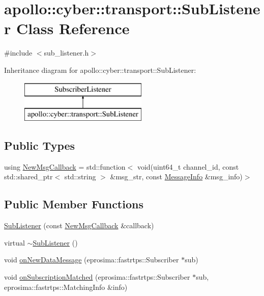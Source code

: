 \hypertarget{classapollo_1_1cyber_1_1transport_1_1SubListener}{\section{apollo\-:\-:cyber\-:\-:transport\-:\-:Sub\-Listener Class Reference}
\label{classapollo_1_1cyber_1_1transport_1_1SubListener}
}


{\ttfamily \#include $<$sub\-\_\-listener.\-h$>$}

Inheritance diagram for apollo\-:\-:cyber\-:\-:transport\-:\-:Sub\-Listener\-:\begin{figure}[H]
\begin{center}
\leavevmode
\includegraphics[height=2.000000cm]{classapollo_1_1cyber_1_1transport_1_1SubListener}
\end{center}
\end{figure}
\subsection*{Public Types}
\begin{DoxyCompactItemize}
\item 
using \hyperlink{classapollo_1_1cyber_1_1transport_1_1SubListener_a68a33307591d34661a88c1e637bb3d8f}{New\-Msg\-Callback} = std\-::function$<$ void(uint64\-\_\-t channel\-\_\-id, const std\-::shared\-\_\-ptr$<$ std\-::string $>$ \&msg\-\_\-str, const \hyperlink{classapollo_1_1cyber_1_1transport_1_1MessageInfo}{Message\-Info} \&msg\-\_\-info)$>$
\end{DoxyCompactItemize}
\subsection*{Public Member Functions}
\begin{DoxyCompactItemize}
\item 
\hyperlink{classapollo_1_1cyber_1_1transport_1_1SubListener_a7d2e2b6182670deab99a6f93b79453f7}{Sub\-Listener} (const \hyperlink{classapollo_1_1cyber_1_1transport_1_1SubListener_a68a33307591d34661a88c1e637bb3d8f}{New\-Msg\-Callback} \&callback)
\item 
virtual \hyperlink{classapollo_1_1cyber_1_1transport_1_1SubListener_ae8fe11042b67798dee8df5263ca06f7d}{$\sim$\-Sub\-Listener} ()
\item 
void \hyperlink{classapollo_1_1cyber_1_1transport_1_1SubListener_ae9a66ce9990acb7a6a5acee27d6b8a56}{on\-New\-Data\-Message} (eprosima\-::fastrtps\-::\-Subscriber $\ast$sub)
\item 
void \hyperlink{classapollo_1_1cyber_1_1transport_1_1SubListener_a88201fd22080c2bcf49812a82b43214d}{on\-Subscription\-Matched} (eprosima\-::fastrtps\-::\-Subscriber $\ast$sub, eprosima\-::fastrtps\-::\-Matching\-Info \&info)
\end{DoxyCompactItemize}
